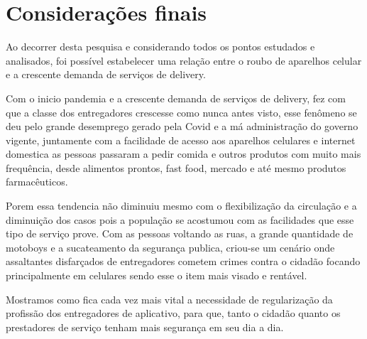 \section{Considerações finais}

    Ao decorrer desta pesquisa e considerando todos os pontos estudados e analisados,
    foi possível estabelecer uma relação entre o roubo de aparelhos celular e a
    crescente demanda de serviços de delivery. 

    Com o inicio pandemia e a crescente demanda de serviços de delivery, 
    fez com que a classe dos entregadores  crescesse como nunca antes visto, 
    esse fenômeno se deu pelo grande desemprego gerado pela Covid e a má 
    administração do governo vigente, juntamente com a facilidade de acesso aos 
    aparelhos celulares e internet domestica as pessoas passaram a pedir comida 
    e outros produtos com muito mais frequência, desde alimentos prontos, fast 
    food, mercado e até mesmo produtos farmacêuticos.

    Porem essa tendencia não diminuiu mesmo com o flexibilização da circulação 
    e a diminuição dos casos pois a população se acostumou com as facilidades 
    que esse tipo de serviço prove. Com as pessoas voltando as ruas,
    a grande quantidade de motoboys e a sucateamento da segurança publica, criou-se um cenário onde
    assaltantes disfarçados de entregadores cometem crimes contra o cidadão focando principalmente em 
    celulares sendo esse o item mais visado e rentável.

    Mostramos como fica cada vez mais vital a necessidade de regularização
    da profissão dos entregadores de aplicativo, para que, tanto o cidadão
    quanto os prestadores de serviço tenham mais segurança em seu dia a dia.

\postextual